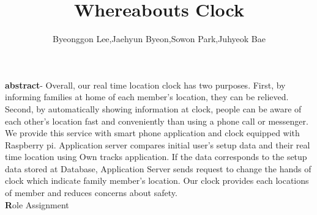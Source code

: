 \documentclass[10pt,a4paper,twocolumn]{report}
\begin{document}
\title{Whereabouts Clock}
\author{Byeonggon Lee,Jaehyun Byeon,Sowon Park,Juhyeok Bae}
\maketitle





\textbf{abstract}- Overall, our real time location clock has two purposes. First, by informing families at home of each member’s location, they can be relieved. Second, by automatically showing information at clock, people can be aware of each other's location fast and conveniently than using a phone call or messenger. We provide this service with smart phone application and clock equipped with Raspberry pi. Application server compares initial user's setup data and their real time location using Own tracks application. If the data corresponds to the setup data stored at Database, Application Server sends request to change the hands of clock which indicate family member’s location. Our clock provides each locations of member and reduces concerns about safety. \\
\textbf Role Assignment \\
\end{document}
